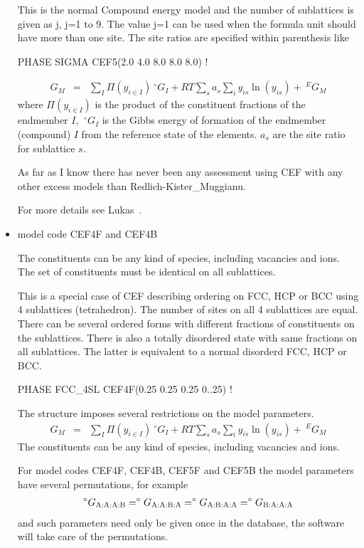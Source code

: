 \documentclass[12pt]{article}
\begin{document}
\begin{itemize}
  This is the normal Compound energy model and the number of
  sublattices is given as j, j=1 to 9.  The value j=1 can be used when
  the formula unit should have more than one site.  The site ratios
  are specified within parenthesis like
  
  PHASE SIGMA CEF5(2.0 4.0 8.0 8.0 8.0) !
  
  \begin{eqnarray}
    G_M &=& \sum_I \Pi(y_{i\in I}) ~^{\circ}G_I + RT \sum_s a_s \sum_i y_{is}\ln(y_{is}) + ~^EG_M
  \end{eqnarray}
  where $\Pi(y_{i\in I})$ is the product of the constituent fractions
  of the endmember $I$, $~^{\circ}G_I$ is the Gibbs energy of
  formation of the endmember (compound) $I$ from the reference state
  of the elements.  $a_s$ are the site ratio for sublattice $s$.

  As far as I know there has never been any assessment using CEF with
  any other excess models than Redlich-Kister\_Muggianu.

  For more details see Lukas~\cite{07Luk}.

\item model code CEF4F and CEF4B 

  The constituents can be any kind of species, including vacancies and
  ions.  The set of constituents must be identical on all sublattices.

  This is a special case of CEF describing ordering on FCC, HCP or BCC
  using 4 sublattices (tetrahedron).  The number of sites on all 4
  sublattices are equal.  There can be several ordered forms with
  different fractions of constituents on the sublattices.  There is
  also a totally disordered state with same fractions on all
  sublattices.  The latter is equivalent to a normal disorderd FCC,
  HCP or BCC.

  PHASE FCC\_4SL CEF4F(0.25 0.25 0.25 0..25) !

  The structure imposes several restrictions on the model parameters.
  \begin{eqnarray}
    G_M &=& \sum_I \Pi(y_{i\in I}) ~^{\circ}G_I + RT \sum_s a_s \sum_i y_{is}\ln(y_{is}) + ~^EG_M
  \end{eqnarray}
  The constituents can be any kind of species, including vacancies and
  ions.

  For model codes CEF4F, CEF4B, CEF5F and CEF5B the model parameters
  have several permutations, for example
  \begin{eqnarray}
    ^{\circ}G_{\rm A:A:A:B}=^{\circ}G_{\rm A:A:B:A}=^{\circ}G_{\rm A:B:A:A}=^{\circ}G_{\rm B:A:A:A}
  \end{eqnarray}
  and such parameters need only be given once in the database, the
  software will take care of the permutations.


\end{itemize}
\end{document}
